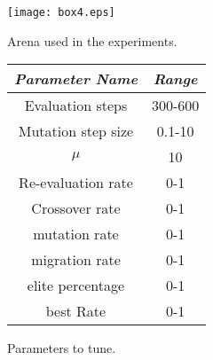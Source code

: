 \documentclass[runningheads]{llncs}
\begin{document}
\begin{figure}[b!]
  \centering
 
  \begin{minipage}[c]{0.58\textwidth}
  \centering
    \texttt{[image: box4.eps]}
    \caption{Arena used in the experiments.}
    \label{fig:arena}
  \end{minipage}
   \begin{minipage}[c]{0.38\textwidth}
    \centering
    \begin{tabular}{|c|c|}
\hline
{\em Parameter Name} & {\em Range} \\\hline
Evaluation steps & 300-600  \\\hline
Mutation step size & 0.1-10 \\\hline
$\mu$ &  10 \\\hline
Re-evaluation rate & 0-1  \\\hline
Crossover rate &  0-1\\\hline
mutation rate &  0-1\\\hline
migration rate &  0-1\\\hline
elite percentage & 0-1 \\\hline
best Rate &  0-1\\\hline
\end{tabular}
	\caption{Parameters to tune.}
	\label{tab:parameters}
  \end{minipage}
  \end{figure}




\end{document}
